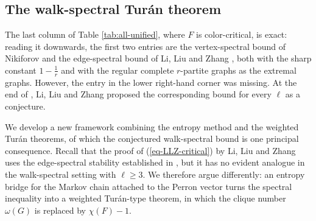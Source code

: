 \documentclass[11pt, a4paper]{article}
\theoremstyle{definition}
\theoremstyle{plain}
\renewcommand{\le}{\leqslant}
\renewcommand{\ge}{\geqslant}
\newcommand{\srcc}[1]{{\scriptsize\color{black!60}#1}}
\newcommand{\srcn}[1]{{\scriptsize\bfseries\color{figamber!85!black}#1}}
\begin{document}
\begin{table}[htbp]
\caption{All entries assume $\chi (F)=r+1$. The entries in the last column require the relevant parameter to be sufficiently large, and the entry for $w_\ell$ excludes the pair $(r,\ell )=(2,2)$.}
\label{tab:all-unified}
\end{table}



\vspace{-3mm}
\subsection{The walk-spectral Tur\'{a}n theorem} 


The last column of Table \ref{tab:all-unified},
where $F$ is color-critical, is exact: reading 
it downwards, the first two entries are the vertex-spectral bound of Nikiforov \cite{Nik2009-critical} and the edge-spectral bound of Li, Liu and Zhang \cite{LLZ-Critical}, both with the sharp constant
$1-\frac1r$ and with the regular complete
$r$-partite graphs as the extremal graphs. 
However, the entry in the lower right-hand corner was missing. At the end of \cite{LLZ-Critical}, 
Li, Liu and Zhang proposed the corresponding 
bound for every $\ell$ as a conjecture.  

\smallskip 
We develop a new framework combining the entropy method and the weighted Tur\'{a}n theorems, 
of which the conjectured walk-spectral bound is one principal consequence. 
Recall that the proof of (\ref{eq-LLZ-critical}) by  Li, Liu and Zhang \cite{LLZ-Critical} uses the edge-spectral
stability established in \cite{LLZ-ESS}, but it has no evident analogue in the walk-spectral setting with $\ell \ge 3$. 
We therefore argue differently:  
 an entropy bridge for the Markov chain attached to the Perron vector turns the spectral inequality into a weighted Tur\'an-type theorem, in which the clique number $\omega (G)$ is replaced by $\chi (F)-1$.
 
\end{document}
